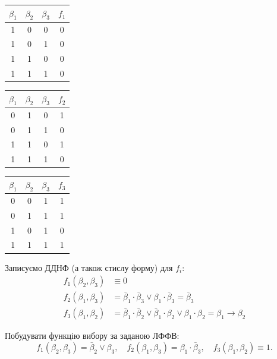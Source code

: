\begin{solution}
    \begin{table}[H]
        \centering
        \begin{tabular}[t]{|c|c|c|c|}
            \hline
            $\beta_1$ & $\beta_2$ & $\beta_3$ & $f_1$ \\ \hline
            1 & 0 & 0 & 0 \\
            1 & 0 & 1 & 0 \\
            1 & 1 & 0 & 0 \\
            1 & 1 & 1 & 0 \\ \hline
        \end{tabular}
        \hfill
        \begin{tabular}[t]{|c|c|c|c|}
            \hline
            $\beta_1$ & $\beta_2$ & $\beta_3$ & $f_2$ \\ \hline
            0 & 1 & 0 & 1 \\
            0 & 1 & 1 & 0 \\
            1 & 1 & 0 & 1 \\
            1 & 1 & 1 & 0 \\ \hline
        \end{tabular}
        \hfill
        \begin{tabular}[t]{|c|c|c|c|}
            \hline
            $\beta_1$ & $\beta_2$ & $\beta_3$ & $f_3$ \\ \hline
            0 & 0 & 1 & 1 \\
            0 & 1 & 1 & 1 \\
            1 & 0 & 1 & 0 \\
            1 & 1 & 1 & 1 \\ \hline
        \end{tabular}
    \end{table}
    
    Записуємо ДДНФ (а також стислу форму) для $f_i$:
    \begin{align*}
        f_1(\beta_2, \beta_3) &\equiv 0 \\
        f_2(\beta_1, \beta_3) &= \bar \beta_1 \cdot \bar \beta_3 \lor \beta_1 \cdot \bar \beta_3 = \bar \beta_3 \\
        f_3(\beta_1, \beta_2) &= \bar \beta_1 \cdot \bar \beta_2 \lor \bar \beta_1 \cdot \beta_2 \lor \beta_1 \cdot \beta_2 = \beta_1 \rightarrow \beta_2
    \end{align*}
\end{solution}

\newpage

\begin{problem}
    Побудувати функцію вибору за заданою ЛФФВ: \[ f_1(\beta_2, \beta_3) = \bar \beta_2 \lor \beta_3, \quad f_2(\beta_1, \beta_3) = \beta_1 \cdot \bar \beta_3, \quad f_3(\beta_1, \beta_2) \equiv 1. \]
\end{problem}

